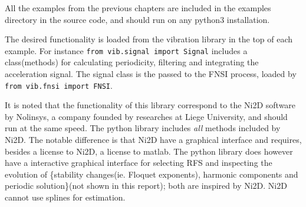 All the examples from the previous chapters are included in the examples
directory in the source code, and should run on any python3 installation.

The desired functionality is loaded from the vibration library in the top of
each example. For instance \texttt{from vib.signal import Signal} includes a
class(methods) for calculating periodicity, filtering and integrating the
acceleration signal. The signal class is the passed to the FNSI process, loaded
by \texttt{from vib.fnsi import FNSI}.

It is noted that the functionality of this library correspond to the Ni2D
software by Nolinsys, a company founded by researches at Liege University, and
should run at the same speed. The python library includes \textit{all} methods
included by Ni2D. The notable difference is that Ni2D have a graphical interface
and requires, besides a license to Ni2D, a license to matlab. The python library
does however have a interactive graphical interface for selecting RFS and
inspecting the evolution of \{stability changes(ie. Floquet exponents), harmonic
components and periodic solution\}(not shown in this report); both are inspired
by Ni2D. Ni2D cannot use splines for estimation.


